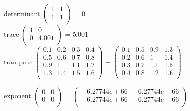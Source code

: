 \documentclass{article}
\begin{document}
determinant
$\begin{pmatrix}
1 & 1\\
1 & 1\\
\end{pmatrix}$
 = 0 \\ 

trace
$\begin{pmatrix}
1 & 0\\
0 & 4.001\\
\end{pmatrix}$
 = 5.001 \\ 

transpose
$\begin{pmatrix}
0.1 & 0.2 & 0.3 & 0.4\\
0.5 & 0.6 & 0.7 & 0.8\\
0.9 & 1 & 1.1 & 1.2\\
1.3 & 1.4 & 1.5 & 1.6\\
\end{pmatrix}$
 = $\begin{pmatrix}
0.1 & 0.5 & 0.9 & 1.3\\
0.2 & 0.6 & 1 & 1.4\\
0.3 & 0.7 & 1.1 & 1.5\\
0.4 & 0.8 & 1.2 & 1.6\\
\end{pmatrix}$

exponent
$\begin{pmatrix}
0 & 0\\
0 & 0\\
\end{pmatrix}$
 = $\begin{pmatrix}
-6.27744e+66 & -6.27744e+66\\
-6.27744e+66 & -6.27744e+66\\
\end{pmatrix}$
\end{document}
